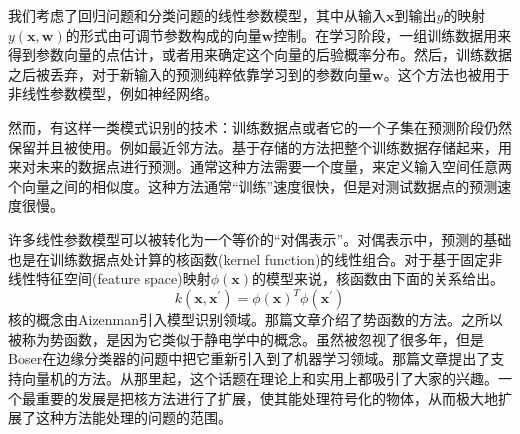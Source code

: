 我们考虑了回归问题和分类问题的线性参数模型，其中从输入$\boldsymbol{x}$到输出$y$的映射$y(\boldsymbol{x},\boldsymbol{w})$的形式由可调节参数构成的向量$\boldsymbol{w}$控制。在学习阶段，一组训练数据用来得到参数向量的点估计，或者用来确定这个向量的后验概率分布。然后，训练数据之后被丢弃，对于新输入的预测纯粹依靠学习到的参数向量$\boldsymbol{w}$。这个方法也被用于非线性参数模型，例如神经网络。

然而，有这样一类模式识别的技术：训练数据点或者它的一个子集在预测阶段仍然保留并且被使用。例如最近邻方法。基于存储的方法把整个训练数据存储起来，用来对未来的数据点进行预测。通常这种方法需要一个度量，来定义输入空间任意两个向量之间的相似度。这种方法通常“训练”速度很快，但是对测试数据点的预测速度很慢。

许多线性参数模型可以被转化为一个等价的“对偶表示”。对偶表示中，预测的基础也是在训练数据点处计算的核函数(kernel function)的线性组合。对于基于固定非线性特征空间(feature space)映射$\phi(\boldsymbol{x})$的模型来说，核函数由下面的关系给出。
\begin{equation}
\label{kernel}
	k(\boldsymbol{x},\boldsymbol{x}^{'})=\phi(\boldsymbol{x})^T\phi(\boldsymbol{x}^{'})
\end{equation}
核的概念由Aizenman引入模型识别领域。那篇文章介绍了势函数的方法。之所以被称为势函数，是因为它类似于静电学中的概念。虽然被忽视了很多年，但是Boser在边缘分类器的问题中把它重新引入到了机器学习领域。那篇文章提出了支持向量机的方法。从那里起，这个话题在理论上和实用上都吸引了大家的兴趣。一个最重要的发展是把核方法进行了扩展，使其能处理符号化的物体，从而极大地扩展了这种方法能处理的问题的范围。